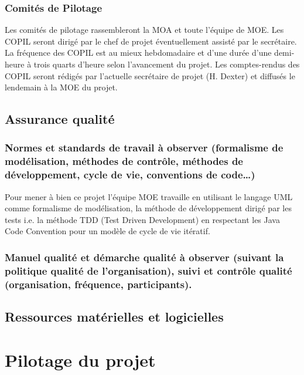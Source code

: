 \documentclass[11pt,a4paper,titlepage,openany]{report}
\begin{document}
    \subsection{Comités de Pilotage}
    Les comités de pilotage rassembleront la MOA et toute l’équipe de MOE. Les
    COPIL seront dirigé par le chef de projet éventuellement assisté par le
    secrétaire.
    \\La fréquence des COPIL est au mieux hebdomadaire et d’une durée d’une
    demi-heure à trois quarts d’heure selon l’avancement du projet.
    Les comptes-rendus des COPIL seront rédigés par l’actuelle secrétaire de
    projet (H. Dexter) et diffusés le lendemain à la MOE du projet.


    \section{Assurance qualité}
    \subsection{Normes et standards de travail à observer (formalisme de modélisation, méthodes de contrôle, méthodes de développement, cycle de vie, conventions de code…)}
    Pour mener à bien ce projet l'équipe MOE travaille
    en utilisant le langage UML comme formalisme de modélisation, la méthode de
    développement dirigé par les tests i.e. la méthode TDD (Test Driven
    Development) en respectant les Java Code Convention pour un modèle de cycle
    de vie itératif.

    \subsection{Manuel qualité et démarche qualité à observer (suivant la politique qualité de l’organisation), suivi et contrôle qualité (organisation, fréquence, participants).}


    \section{Ressources matérielles et logicielles}


    \chapter{Pilotage du projet}
\end{document}
